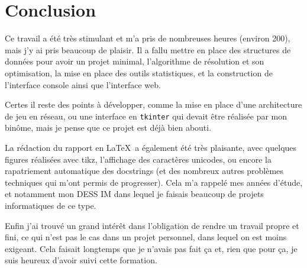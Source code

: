 \chapter{Conclusion}
Ce travail a été très stimulant et m'a pris de nombreuses heures (environ 200), mais j'y ai pris beaucoup de plaisir. Il a fallu mettre en place des structures de données pour avoir un projet minimal, l'algorithme de résolution et son optimisation, la mise en place des outils statistiques, et la construction de l'interface console ainsi que l'interface web.

Certes il reste des points à développer, comme la mise en place d'une architecture de jeu en réseau, ou une interface en \texttt{tkinter} qui devait être réalisée par mon binôme, mais je pense que ce projet est déjà bien abouti. 

La rédaction du rapport en \LaTeX\ a également été très plaisante, avec quelques figures réalisées avec tikz, l'affichage des caractères unicodes, ou encore la rapatriement automatique des docstrings (et des nombreux autres problèmes techniques qui m'ont permis de progresser). Cela m'a rappelé mes années d'étude, et notamment mon DESS IM dans lequel je faisais beaucoup de projets informatiques de ce type.

Enfin j'ai trouvé un grand intérêt dans l'obligation de rendre un travail propre et fini, ce qui n'est pas le cas dans un projet personnel, dans lequel on est moins exigeant. Cela faisait longtemps que je n'avais pas fait ça et, rien que pour ça, je suis heureux d'avoir suivi cette formation.
